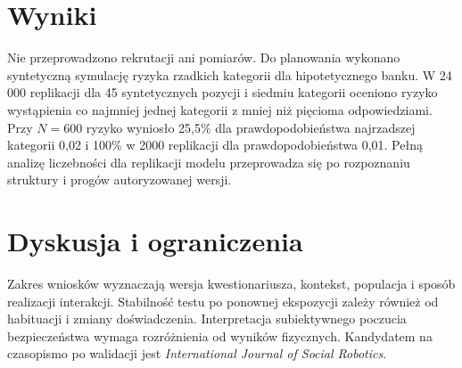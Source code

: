 \documentclass[11pt,a4paper]{article}
\begin{document}
\section{Wyniki}
Nie przeprowadzono rekrutacji ani pomiarów. Do planowania wykonano syntetyczną symulację ryzyka rzadkich kategorii dla hipotetycznego banku. W 24\,000 replikacji dla 45 syntetycznych pozycji i siedmiu kategorii oceniono ryzyko wystąpienia co najmniej jednej kategorii z mniej niż pięcioma odpowiedziami. Przy $N=600$ ryzyko wyniosło 25,5\% dla prawdopodobieństwa najrzadszej kategorii 0,02 i 100\% w 2000 replikacji dla prawdopodobieństwa 0,01. Pełną analizę liczebności dla replikacji modelu przeprowadza się po rozpoznaniu struktury i progów autoryzowanej wersji.

\section{Dyskusja i ograniczenia}
Zakres wniosków wyznaczają wersja kwestionariusza, kontekst, populacja i sposób realizacji interakcji. Stabilność testu po ponownej ekspozycji zależy również od habituacji i zmiany doświadczenia. Interpretacja subiektywnego poczucia bezpieczeństwa wymaga rozróżnienia od wyników fizycznych. Kandydatem na czasopismo po walidacji jest \emph{International Journal of Social Robotics}.


\end{document}

